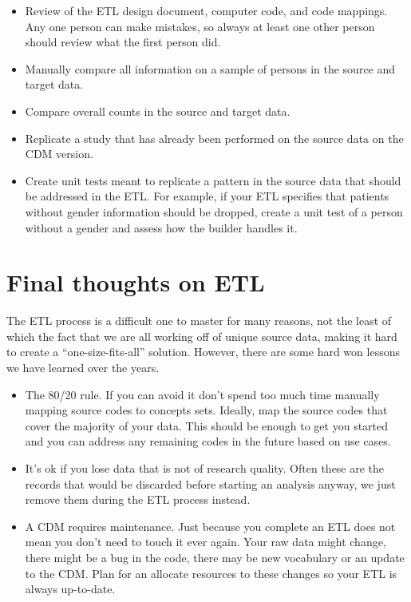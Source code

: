 \documentclass[11pt]{book}
\providecommand{\tightlist}{%
  \setlength{\itemsep}{0pt}\setlength{\parskip}{0pt}}
\theoremstyle{definition}
\theoremstyle{definition}
\theoremstyle{definition}
\theoremstyle{remark}
\begin{document}
\begin{itemize}
\tightlist
\item
  Review of the ETL design document, computer code, and code mappings. Any one person can make mistakes, so always at least one other person should review what the first person did.
\item
  Manually compare all information on a sample of persons in the source and target data.
\item
  Compare overall counts in the source and target data.
\item
  Replicate a study that has already been performed on the source data on the CDM version.
\item
  Create unit tests meant to replicate a pattern in the source data that should be addressed in the ETL. For example, if your ETL specifies that patients without gender information should be dropped, create a unit test of a person without a gender and assess how the builder handles it.
\end{itemize}

\hypertarget{final-thoughts-on-etl}{%
\section{Final thoughts on ETL}\label{final-thoughts-on-etl}}

The ETL process is a difficult one to master for many reasons, not the least of which the fact that we are all working off of unique source data, making it hard to create a ``one-size-fits-all'' solution. However, there are some hard won lessons we have learned over the years.

\begin{itemize}
\tightlist
\item
  The 80/20 rule. If you can avoid it don't spend too much time manually mapping source codes to concepts sets. Ideally, map the source codes that cover the majority of your data. This should be enough to get you started and you can address any remaining codes in the future based on use cases.
\item
  It's ok if you lose data that is not of research quality. Often these are the records that would be discarded before starting an analysis anyway, we just remove them during the ETL process instead.
\item
  A CDM requires maintenance. Just because you complete an ETL does not mean you don't need to touch it ever again. Your raw data might change, there might be a bug in the code, there may be new vocabulary or an update to the CDM. Plan for an allocate resources to these changes so your ETL is always up-to-date.
\end{itemize}
\end{document}
